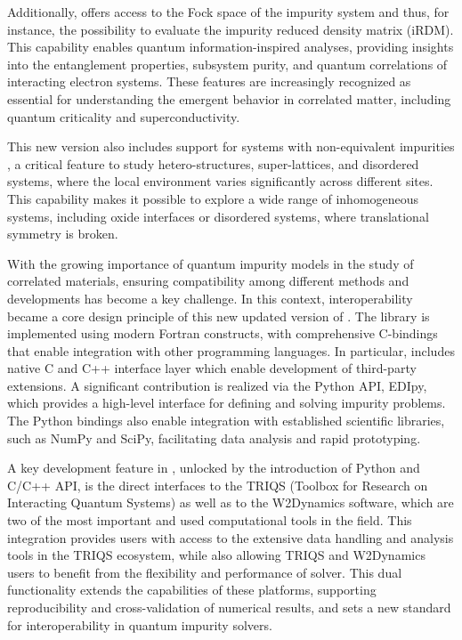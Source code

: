\documentclass[edipack2.tex]{subfiles}
\begin{document}
Additionally, \NAME offers access to the Fock space of
the impurity system and thus, for instance, the possibility to
evaluate the impurity reduced density matrix
(iRDM). This capability enables quantum information-inspired analyses, providing insights into the entanglement properties, subsystem purity, and quantum correlations of interacting electron systems. These
features are increasingly recognized as essential for understanding the emergent behavior in correlated matter, including quantum criticality and superconductivity.

This new version also includes support for systems with non-equivalent impurities , a critical feature to study hetero-structures, super-lattices, and disordered systems, where the local environment varies significantly across different sites. This capability makes it 
possible to explore a wide range of inhomogeneous systems, including
oxide interfaces or disordered systems, where
translational symmetry is broken.


With the growing importance of  quantum impurity models in the study of correlated materials, ensuring compatibility among different methods and developments has become a key challenge.
In this context, interoperability became a core design principle of this new updated version of \NAME. The library is implemented using modern Fortran constructs, with comprehensive C-bindings that enable integration with other programming languages. 
In particular, \NAME includes native C and C++
interface layer which enable development of third-party
extensions. A significant contribution is realized via the Python API, EDIpy, which provides a high-level interface for defining and solving impurity problems. The
Python bindings also enable integration with established scientific
libraries, such as NumPy and SciPy, facilitating data analysis and
rapid prototyping.

A key development feature in \NAME, unlocked by the introduction of Python and C/C++ API, is the direct  interfaces to the TRIQS
(Toolbox for Research on Interacting Quantum Systems)  as
well as to the W2Dynamics software, which are two of the most important and used computational tools in the field. 
This integration provides \NAME users with access to the
extensive data handling and analysis tools in the TRIQS ecosystem,
while also allowing TRIQS and W2Dynamics users to benefit from the
flexibility and performance of \NAME solver. This dual functionality
extends the capabilities of these platforms, supporting
reproducibility and cross-validation of numerical results, and sets a
new standard for interoperability in quantum impurity solvers.
\end{document}
